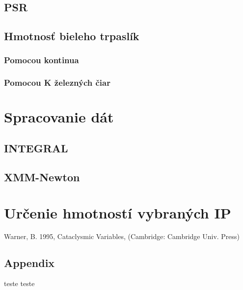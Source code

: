 \documentclass[oneside,a4paper,11pt]{report}
\begin{document}
\section{PSR}
\section{Hmotnosť bieleho trpaslík}
\subsection{Pomocou kontinua}
\subsection{Pomocou K železných čiar}
\chapter{Spracovanie dát}
\section{INTEGRAL}
\section{XMM-Newton}
\chapter{Určenie hmotností vybraných IP}







\begin{thebibliography}{99}
 Warner, B. 1995, Cataclysmic Variables, (Cambridge: Cambridge Univ. Press)


\end{thebibliography}


\appendix
\section*{Appendix}
teste teste
\end{document}
